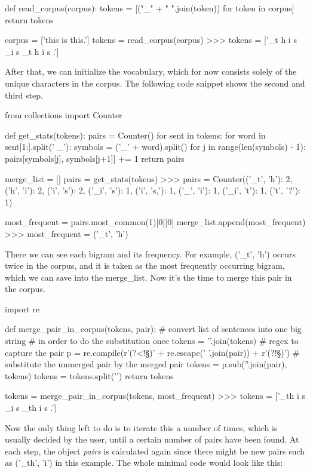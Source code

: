 \begin{python}
def read_corpus(corpus):
    tokens = [("_" + " ".join(token)) for token in corpus]
    return tokens

corpus = ['this is this.']
tokens = read_corpus(corpus)
>>> tokens = ['_t h i s _i s _t h i s .']
\end{python}

After that, we can initialize the vocabulary, which for now consists solely of the unique characters in the corpus. The following code snippet shows the second and third step.

\begin{python}
from collections import Counter

def get_stats(tokens):
    pairs = Counter()
    for sent in tokens:
        for word in sent[1:].split(' _'):
            symbols = ('_' + word).split()
            for j in range(len(symbols) - 1):
                pairs[symbols[j], symbols[j+1]] += 1
    return pairs

merge_list = []
pairs = get_stats(tokens)
>>> pairs = Counter({('_t', 'h'): 2, ('h', 'i'): 2, ('i', 's'): 2, 
                    ('_i', 's'): 1, ('i', 's,'): 1, ('_', 'i'): 1, 
                    ('_i', 't'): 1, ('t', '?'): 1})

most_frequent = pairs.most_common(1)[0][0]
merge_list.append(most_frequent)
>>> most_frequent = ('_t', 'h')
\end{python}

There we can see each bigram and its frequency. For example, ('\_t', 'h') occurs twice in the corpus, and it is taken as the most frequently occurring bigram, which we can save into the merge\_list. Now it's the time to merge this pair in the corpus.

\begin{python}
import re

def merge_pair_in_corpus(tokens, pair):
    # convert list of sentences into one big string 
    # in order to do the substitution once
    tokens = '\n'.join(tokens)
    # regex to capture the pair
    p = re.compile(r'(?<!\S)' + re.escape(' '.join(pair)) + r'(?!\S)')
    # substitute the unmerged pair by the merged pair
    tokens = p.sub(''.join(pair), tokens)
    tokens = tokens.split('\n')
    return tokens

tokens = merge_pair_in_corpus(tokens, most_frequent)
>>> tokens = ['_th i s _i s _th i s .']
\end{python}

Now the only thing left to do is to iterate this a number of times, which is usually decided by the user, until a certain number of pairs have been found. At each step, the object \emph{pairs} is calculated again since there might be new pairs such as ('\_th', 'i') in this example. The whole minimal code would look like this:

